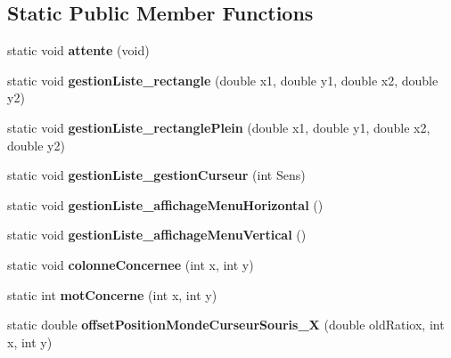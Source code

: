 \subsection*{Static Public Member Functions}
\begin{DoxyCompactItemize}
\item 
\mbox{\label{classopenGlInterface_a8896e795148e1e7809811e8497b75913}} 
static void {\bfseries attente} (void)
\item 
\mbox{\label{classopenGlInterface_aee682263bcffbc47dd9f6df0c85c1bc0}} 
static void {\bfseries gestion\+Liste\+\_\+rectangle} (double x1, double y1, double x2, double y2)
\item 
\mbox{\label{classopenGlInterface_aeb8c2e01f2f2ec59d8a01fdea9450cff}} 
static void {\bfseries gestion\+Liste\+\_\+rectangle\+Plein} (double x1, double y1, double x2, double y2)
\item 
\mbox{\label{classopenGlInterface_ab53f71ec83a26e06f4b8d97b7459b6ee}} 
static void {\bfseries gestion\+Liste\+\_\+gestion\+Curseur} (int Sens)
\item 
\mbox{\label{classopenGlInterface_aa686ac044c55389cc7f2b5415befbe5f}} 
static void {\bfseries gestion\+Liste\+\_\+affichage\+Menu\+Horizontal} ()
\item 
\mbox{\label{classopenGlInterface_a51a7026004c45cee6cf1d9df50e4f1e7}} 
static void {\bfseries gestion\+Liste\+\_\+affichage\+Menu\+Vertical} ()
\item 
\mbox{\label{classopenGlInterface_acbd69c19fc4c90a723e14797cbfbacca}} 
static void {\bfseries colonne\+Concernee} (int x, int y)
\item 
\mbox{\label{classopenGlInterface_aedf2ea6f451cce3507fbd376c82e9476}} 
static int {\bfseries mot\+Concerne} (int x, int y)
\item 
\mbox{\label{classopenGlInterface_a1ae632cac9f86be8ff949b23f8b817ff}} 
static double {\bfseries offset\+Position\+Monde\+Curseur\+Souris\+\_\+X} (double old\+Ratiox, int x, int y)

\end{DoxyCompactItemize}
